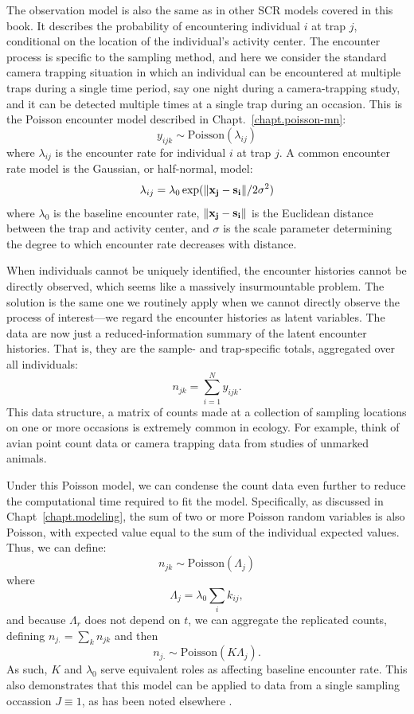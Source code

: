 The observation model is also the same as in other SCR models covered
in this book. It describes the probability of encountering individual
$i$ at trap $j$, conditional on the location of the individual's
activity center. The encounter process is specific to the
sampling method, and here we consider the standard camera trapping
situation in which an individual can be encountered at multiple traps
during a single time period, say one night during a camera-trapping
study, and it can be detected multiple times at a single trap during
an occasion. This is the Poisson encounter model described in
Chapt.~\ref{chapt.poisson-mn}:
\begin{equation}
 y_{ijk} \sim \mbox{Poisson}(\lambda_{ij})
\label{eq.latentPoisson}
\end{equation}
where $\lambda_{ij}$ is the encounter rate
for individual $i$ at trap $j$. A common encounter rate model is the
Gaussian, or half-normal, model:
\[
\lambda_{ij} = \lambda_0 \exp(\| {\bf x_j - s_i} \| / 2\sigma^2)
\]
where $\lambda_0$ is the baseline encounter rate, $\| {\bf x_j - s_i}
\|$ is the Euclidean distance between the trap and activity center, and $\sigma$ is the
scale parameter determining the degree to which encounter rate decreases with
distance.

When individuals cannot be uniquely identified, the encounter histories cannot
be directly observed, which seems like a massively insurmountable
problem. The solution is the same one we routinely apply when we
cannot directly observe the process of interest---we regard the
encounter histories as latent variables. The data are now just a
reduced-information summary of the latent encounter histories. That
is, they are the sample- and trap-specific totals, aggregated over all
individuals:
\[
n_{jk} = \sum_{i=1}^{N} y_{ijk}.
\]
This data structure, a matrix of counts made at a collection of
sampling locations on one or more occasions is extremely common in
ecology. For example, think of avian point count data or camera
trapping data from studies of unmarked animals.

Under this Poisson model, we can condense the count data even
further to reduce the computational time required to fit the
model. Specifically, as discussed in
Chapt~\ref{chapt.modeling}, the sum of two or more Poisson random
variables is also Poisson, with expected value equal to the sum of the
individual expected values.  Thus, we can define:
\begin{equation}
n_{jk} \sim \mbox{Poisson}( \Lambda_{j} )
\label{eq:nagg}
\end{equation}
where
\[
 \Lambda_{j} = \lambda_0 \sum_{i} k_{ij},
\]
and because $\Lambda_r$ does not depend on $t$, we can
aggregate the replicated counts, defining
$n_{j.} = \sum_{k} n_{jk}$ and then
\[
 n_{j.} \sim \mbox{Poisson}( K \Lambda_{j} ).
\]
As such, $K$ and $\lambda_{0}$ serve equivalent roles as affecting
baseline encounter rate. This also demonstrates that this model can be
applied to data from a single sampling occassion $J \equiv 1$, as has
been noted elsewhere \citep{efford_etal:2009ecol}.

